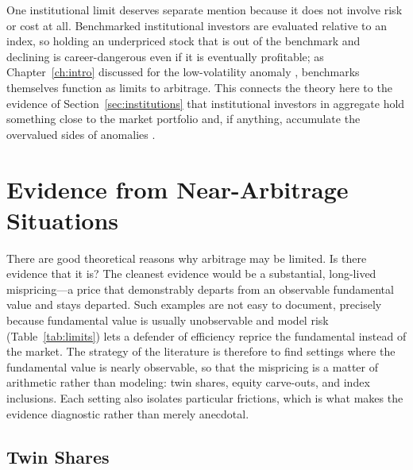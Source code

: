 One institutional limit deserves separate mention because it does not involve risk or cost at all. Benchmarked institutional investors are evaluated relative to an index, so holding an underpriced stock that is out of the benchmark and declining is career-dangerous even if it is eventually profitable; as Chapter~\ref{ch:intro} discussed for the low-volatility anomaly \citep{baker2011,frazzini2014}, benchmarks themselves function as limits to arbitrage. This connects the theory here to the evidence of Section~\ref{sec:institutions} that institutional investors in aggregate hold something close to the market portfolio and, if anything, accumulate the overvalued sides of anomalies \citep{lewellen2011,edelen2016}.

\section{Evidence from Near-Arbitrage Situations}
\label{sec:arbevidence}

There are good theoretical reasons why arbitrage may be limited. Is there evidence that it is? The cleanest evidence would be a substantial, long-lived mispricing---a price that demonstrably departs from an observable fundamental value and stays departed. Such examples are not easy to document, precisely because fundamental value is usually unobservable and model risk (Table~\ref{tab:limits}) lets a defender of efficiency reprice the fundamental instead of the market. The strategy of the literature is therefore to find settings where the fundamental value is nearly observable, so that the mispricing is a matter of arithmetic rather than modeling: twin shares, equity carve-outs, and index inclusions. Each setting also isolates particular frictions, which is what makes the evidence diagnostic rather than merely anecdotal.

\subsection{Twin Shares}

